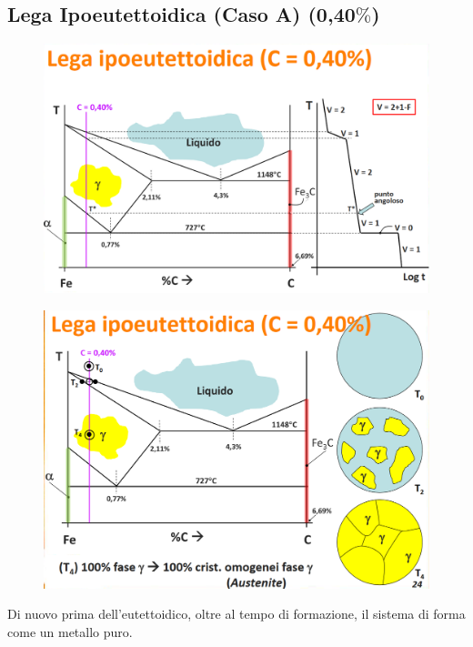 \documentclass{article}
\begin{document}
{        \subsection{Lega Ipoeutettoidica (Caso A) (0,40$\%$)}
            \begin{figure}[h!]
                \centering
                \includegraphics[width=.85\linewidth]{L12 - Diagramma Fe-C - 0,40C - Diagramma e Traiettoria.png}
            \end{figure}
            \begin{figure}[h!]
                \centering
                \includegraphics[width=.85\linewidth]{L12 - Diagramma Fe-C - 0,40C - Cambio di Struttura 1.png}
            \end{figure}
            Di nuovo prima dell'eutettoidico, oltre al tempo di formazione, il sistema di forma come un metallo puro.\\ \\
            \newpage
            \begin{figure}[h!]
                \centering

\end{figure}}
\end{document}
